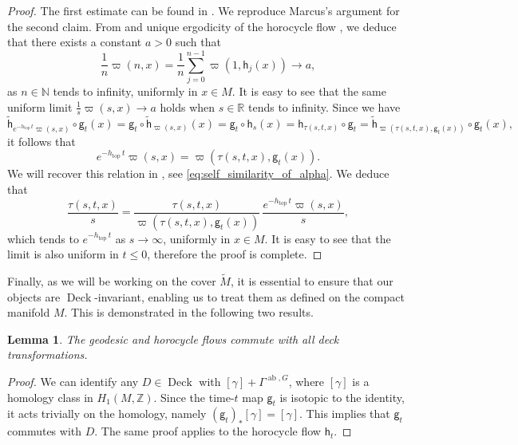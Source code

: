 \documentclass[11pt,letterpaper]{amsart}
\newcommand \R {{ \mathbb R}}
\newcommand \Z {{ \mathbb Z}}
\newcommand \N {{ \mathbb N}}
\newcommand{\horo}{\mathsf{h}}
\newcommand{\geo}{\mathsf{g}}
\DeclareMathOperator{\topp}{top}
\DeclareMathOperator{\Deck}{Deck}
\DeclareMathOperator{\abel}{ab}
\newtheorem {lemma}[theorem]{Lemma}
\theoremstyle{definition}
\begin{document}
\begin{proof}
	The first estimate can be found in \cite[Lemma C.3]{GiLiPo}.
	We reproduce Marcus's argument for the second claim.
From  and unique ergodicity of the horocycle flow \cite{Marcus}, we deduce that there exists a constant $a >0$ such that
\[
\frac{1}{n} \varpi(n,x) = \frac{1}{n} \sum_{j=0}^{n-1} \varpi(1,\horo_j(x)) \to a,
\]
as $n \in \N$ tends to infinity, uniformly in $x\in M$. It is easy to see that the same uniform limit $\frac{1}{s} \varpi(s,x) \to a$ holds when $s \in \R$ tends to infinity.
Since we have
\[
\widetilde{\horo}_{e^{-h_{\topp} \, t} \varpi(s,x)} \circ \geo_t(x) = \geo_t \circ \widetilde{\horo}_{ \varpi(s,x)} (x) =  \geo_t \circ {\horo}_{s}(x) = \horo_{\tau(s,t,x)} \circ \geo_t = \widetilde{\horo}_{\varpi(\tau(s,t,x), \geo_t(x))} \circ \geo_t(x), 
\]
it follows that
\[
e^{-h_{\topp} \, t} \varpi(s,x) = \varpi(\tau(s,t,x), \geo_t(x)).
\]
We will recover this relation in , see \eqref{eq:self_similarity_of_alpha}. 
We deduce that 
\[
\frac{\tau(s,t,x)}{s} = \frac{\tau(s,t,x)}{ \varpi(\tau(s,t,x), \geo_t(x))} \, \frac{e^{-h_{\topp} \, t} \varpi(s,x) }{s},
\]
which tends to $e^{-h_{\topp} \, t}$ as $s \to \infty$, uniformly in $x\in M$. It is easy to see that the limit is also uniform in $t\leq 0$,  therefore the proof is complete.
\end{proof}





Finally, as we will be working on the cover $\widetilde{M}$, it is essential to ensure that our objects are $\Deck$-invariant, enabling us to treat them as defined on the compact manifold $M$. This is demonstrated in the following two results.



\begin{lemma}\label{lem:flows_commute}
The geodesic and horocycle flows commute with all deck transformations.
\end{lemma}
\begin{proof}
We can identify any $D \in \Deck$ with $[\gamma] + \Gamma^{\abel, G}$, where $[\gamma]$ is a homology class in  $H_1(M,\Z)$. 
Since the time-$t$ map $\geo_t$ is isotopic to the identity, it acts trivially on the homology, namely $(\geo_t)_\ast [\gamma] = [\gamma]$. This implies that $\geo_t$ commutes with $D$. The same proof applies to the horocycle flow $\horo_t$.
\end{proof}
\end{document}
